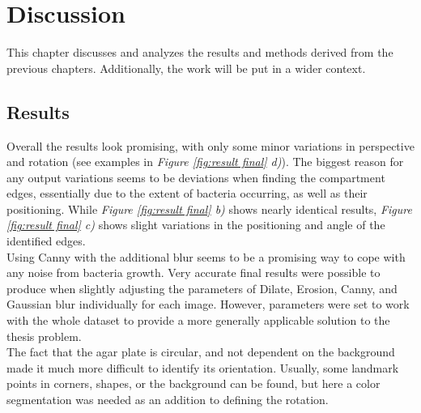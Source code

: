 
\chapter{Discussion}
\label{cha:discussion}
This chapter discusses and analyzes the results and methods derived from the previous chapters. Additionally, the work will be put in a wider context. 

\section{Results}
\label{sec:discussion-results}
Overall the results look promising, with only some minor variations in perspective and rotation (see examples in \textit{Figure \ref{fig:result final} d)}). The biggest reason for any output variations seems to be deviations when finding the compartment edges, essentially due to the extent of bacteria occurring, as well as their positioning. While \textit{Figure \ref{fig:result final} b)} shows nearly identical results,  \textit{Figure \ref{fig:result final} c)} shows slight variations in the positioning and angle of the identified edges. \\

\noindent Using Canny with the additional blur seems to be a promising way to cope with any noise from bacteria growth. Very accurate final results were possible to produce when slightly adjusting the parameters of Dilate, Erosion, Canny, and Gaussian blur individually for each image. However, parameters were set to work with the whole dataset to provide a more generally applicable solution to the thesis problem. \\

\noindent The fact that the agar plate is circular, and not dependent on the background made it much more difficult to identify its orientation.  Usually, some landmark points in corners, shapes, or the background can be found, but here a color segmentation was needed as an addition to defining the rotation. \\

